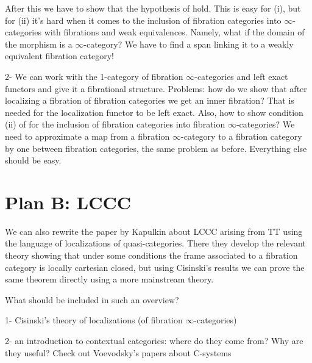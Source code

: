 \documentclass[a4paper,12pt,openany]{scrartcl}
\begin{document}
After this we have to show that the hypothesis of \cite[Thm.\ 7.6.15]{Cis19} hold. This is easy for (i), but for (ii) it's hard when it comes to the inclusion of fibration categories into $\infty$-categories with fibrations and weak equivalences. Namely, what if the domain of the morphism is a $\infty$-category? We have to find a span linking it to a weakly equivalent fibration category!

2- We can work with the 1-category of fibration $\infty$-categories and left exact functors and give it a fibrational structure. Problems: how do we show that after localizing a fibration of fibration categories we get an inner fibration? That is needed for the localization functor to be left exact. Also, how to show condition (ii) of \cite[Thm.\ 7.6.15]{Cis19} for the inclusion of fibration categories into fibration $\infty$-categories? We need to approximate a map from a fibration $\infty$-category to a fibration category by one between fibration categories, the same problem as before. Everything else should be easy.

\section{Plan B: LCCC}

We can also rewrite the paper by Kapulkin about LCCC arising from TT using the language of localizations of quasi-categories. There they develop the relevant theory showing that under some conditions the frame associated to a fibration category is locally cartesian closed, but using Cisinski's results we can prove the same theorem directly using a more mainstream theory.

What should be included in such an overview?

1- Cisinski's theory of localizations (of fibration $\infty$-categories)

2- an introduction to contextual categories: where do they come from? Why are they useful? Check out Voevodsky's papers about C-systems

\printbibliography
\end{document}
